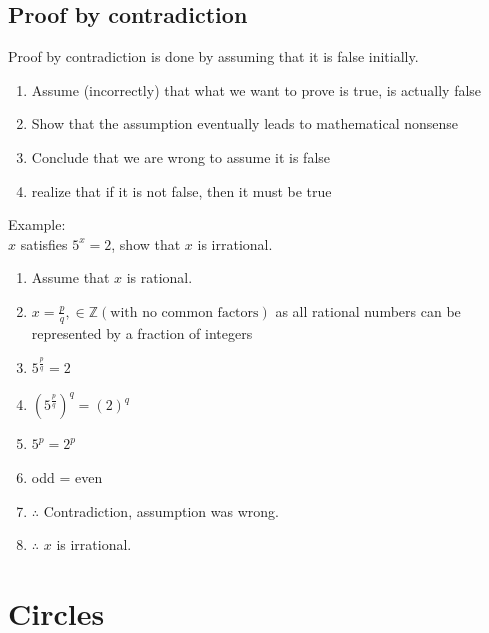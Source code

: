 \documentclass[a4paper,10pt]{report}
\begin{document}
\subsection{Proof by contradiction}
Proof by contradiction is done by assuming that it is false initially.
\begin{enumerate}
	\item Assume (incorrectly) that what we want to prove is true, is actually false
	\item Show that the assumption eventually leads to mathematical nonsense
	\item Conclude that we are wrong to assume it is false
	\item realize that if it is not false, then it must be true
\end{enumerate}
Example:\\
$x$ satisfies $5^x = 2$, show that $x$ is irrational.
\begin{enumerate}
	\item Assume that $x$ is rational.
	\item $x = \frac{p}{q}, \in \mathbb{Z} (\text{with no common factors})$ as all rational numbers can be represented by a fraction of integers
	\item $5^{\frac{p}{q}} = 2$
	\item $(5^{\frac{p}{q}})^q = (2)^q$
	\item $5^p = 2^p$
	\item odd = even
	\item $\therefore$ Contradiction, assumption was wrong.
	\item $\therefore$ $x$ is irrational.
\end{enumerate}

\section{Circles}
\end{document}
